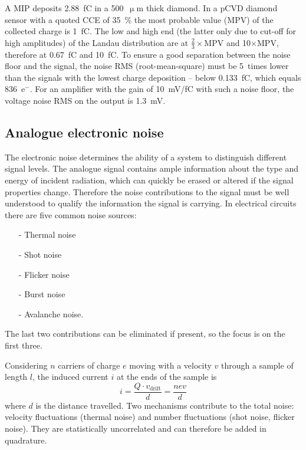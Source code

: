 A MIP deposits 2.88~fC in a 500~$\upmu$m thick diamond. In a pCVD diamond sensor with a quoted CCE of 35~\% the most probable value (MPV) of the collected charge is 1~fC. The low and high end (the latter only due to cut-off for high amplitudes) of the Landau distribution are at $\frac{2}{3}\times$MPV and 10$\times$MPV, therefore at 0.67~fC and 10~fC. To ensure a good separation between the noise floor and the signal, the noise RMS (root-mean-square) must be 5~times lower than the signals with the lowest charge deposition -- below 0.133~fC, which equals 836~e$^{-}$. For an amplifier with the gain of 10~mV/fC with such a noise floor, the voltage noise RMS on the output is 1.3~mV.






\subsection{Analogue electronic noise}
The electronic noise determines the ability of a system to distinguish different signal levels. The analogue signal contains ample information about the type and energy of incident radiation, which can quickly be erased or altered if the signal properties change. Therefore the noise contributions to the signal must be well understood to qualify the information the signal is carrying. In electrical circuits there are five common noise sources:
\begin{itemize}
\item[-]Thermal noise
\item[-]Shot noise
\item[-]Flicker noise
\item[-]Burst noise
\item[-]Avalanche noise.
\end{itemize}
The last two contributions can be eliminated if present, so the focus is on the first three.

Considering $n$ carriers of charge $e$ moving with a velocity $v$ through a sample of length $l$, the induced current $i$ at the ends of the sample is
\begin{equation}
i = \frac {Q \cdot v_\mathrm{drift}} {d}  = \frac {n e v } {d}
\end{equation}
where $d$ is the distance travelled. Two mechanisms contribute to the total noise: velocity fluctuations (thermal noise) and number fluctuations (shot noise, flicker noise). They are statistically uncorrelated and can therefore be added in quadrature.

